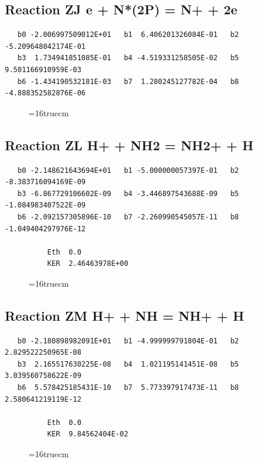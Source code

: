\documentclass[12pt,dvipdfm]{article}
\begin{document}
\subsection{
Reaction ZJ e + N*(2P) = N+ + 2e }
\begin{small}\begin{verbatim}
   b0 -2.006997509012E+01   b1  6.406201326084E-01   b2 -5.209648042174E-01
   b3  1.734941851085E-01   b4 -4.519331258505E-02   b5  9.501166910959E-03
   b6 -1.434190532181E-03   b7  1.280245127782E-04   b8 -4.888352582876E-06
\end{verbatim}\end{small}
\begin{figure}[h!] \label{n2rates}
\epsfxsize=16truecm
\end{figure}
\newpage

\subsection{
Reaction ZL H+ + NH2 = NH2+ + H }
\begin{small}\begin{verbatim}
   b0 -2.148621643694E+01   b1 -5.000000057397E-01   b2 -8.383716094169E-09
   b3 -6.867729106602E-09   b4 -3.446897543688E-09   b5 -1.084983407522E-09
   b6 -2.092157305896E-10   b7 -2.260990545057E-11   b8 -1.049404297976E-12

          Eth  0.0
          KER  2.46463978E+00

\end{verbatim}\end{small}
\begin{figure}[h!] \label{n2rates}
\epsfxsize=16truecm
\end{figure}
\newpage

\subsection{
Reaction ZM H+ + NH = NH+ + H }
\begin{small}\begin{verbatim}
   b0 -2.180898982091E+01   b1 -4.999999791804E-01   b2  2.829522250965E-08
   b3  2.165517630225E-08   b4  1.021195141451E-08   b5  3.039560758622E-09
   b6  5.578425185431E-10   b7  5.773397917473E-11   b8  2.580641219119E-12

          Eth  0.0
          KER  9.84562404E-02
\end{verbatim}\end{small}
\begin{figure}[h!] \label{n2rates}
\epsfxsize=16truecm
\end{figure}
\newpage
\end{document}
